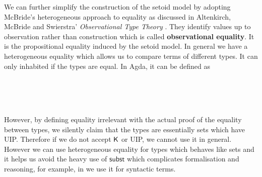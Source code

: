 We can further simplify the construction of the setoid model by adopting McBride's heterogeneous approach to equality as discussed in Altenkirch, McBride and Swierstra' \emph{Observational Type Theory} \cite{alti:ott-conf}. They identify values up to observation rather than construction which is called \textbf{observational equality}. It is the propositional equality induced by the setoid model.  In general we have a heterogeneous equality which allows us to compare terms of different types. It can only inhabited if the types are equal. In Agda, it can be defined as

\begin{code}
\\
\>  \AgdaSymbol{\{} \AgdaSymbol{:} \AgdaSymbol{\}} \AgdaSymbol{(} \AgdaSymbol{:} \AgdaSymbol{)} \AgdaSymbol{:}  \AgdaSymbol{:} \AgdaSymbol{\}}     \<%
\\
\>[0]\<[2]%
\>[2] \AgdaSymbol{:}   \<%
\\
\end{code}


However, by defining equality irrelevant with the actual proof of the equality between types, we silently claim that the types are essentially sets which have UIP. Therefore if we do not accept $\operatorname{\mathsf{K}}$ or UIP, we cannot use it in general. However we can use heterogeneous equality for types which behaves like sets and it helps us avoid the heavy use of $\mathsf{subst}$ which complicates formalisation and reasoning, for example, in  we use it for syntactic terms.












